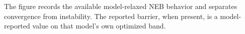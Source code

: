 The figure records the available model-relaxed NEB behavior and separates convergence from instability. The reported barrier, when present, is a model-reported value on that model's own optimized band.
